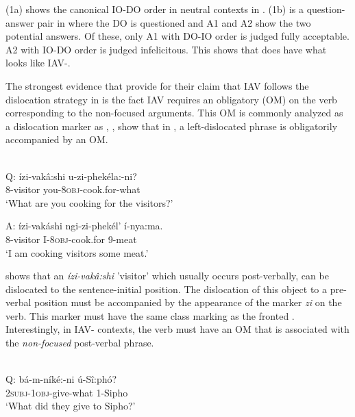 \documentclass[output=paper,newtxmath,modfonts,nonflat,draft]{langsci/langscibook}
\begin{document}
(1a) shows the canonical IO-DO order in neutral contexts in . (1b) is a question-answer pair in  where the DO is questioned and A1 and A2 show the two potential answers. Of these, only A1 with DO-IO order is judged fully acceptable. A2 with IO-DO order is judged infelicitous. This shows that  does have what looks like IAV-. 

The strongest evidence that \citet{chengdowning2012} provide for their claim that  IAV  follows the dislocation strategy in  is the fact  IAV requires an obligatory  (OM) on the verb corresponding to the non-focused arguments. This OM is commonly analyzed as a dislocation marker as \citet{vanderSpuy1993}, \citet{Buell2005,Buell2006}, \citet{Halpert2012} show that in , a left-dislocated phrase is obligatorily accompanied by an OM.

\ea\label{ex:selvanathan:2}
\\
Q: \gll ízi-vakâ:shi  u-zi-phekéla:-ni? \\
	8-visitor      you-\textsc{8obj}{}-cook.for-what \\
\glt \-\hspace{0.5cm}`What are you cooking for the visitors?' 

A: \gll  ízi-vakáshi    ngi-zi-phekél’    í-nya:ma.\\
	8-visitor      I-\textsc{8obj}{}-cook.for    9-meat\\
\glt \-\hspace{0.5cm}`I am cooking visitors some meat.'
\z



 shows that an  \textit{ízi-vakâ:shi} 'visitor' which usually occurs post-verbally, can be dislocated to the sentence-initial position. The dislocation of this object to a pre-verbal position must be accompanied by the appearance of the marker \textit{zi} on the verb. This marker must have the same class marking as the fronted . Interestingly, in IAV- contexts, the verb must have an OM that is associated with the \textit{non-focused} post-verbal phrase.  

\ea\label{ex:selvanathan:3}
 \citep[4]{chengdowning2012}\\
Q: \gll bá-m-níké:-ni      ú-Sî:phó?\\ 
	\textsc{2subj}{}-\textsc{1obj}{}-give-what    1-Sipho\\ 
	\glt \-\hspace{0.5cm}`What did they give to Sipho?’
\end{document}
